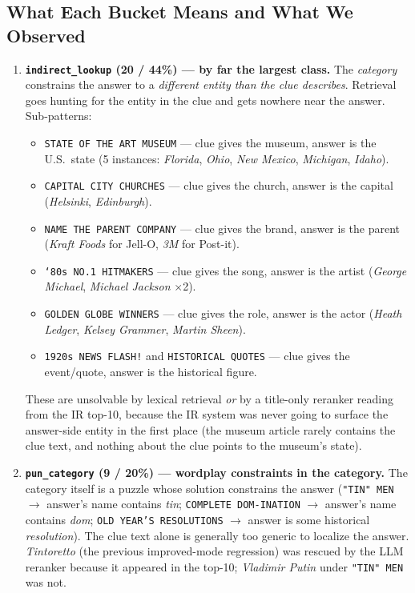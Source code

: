 \documentclass[11pt]{article}
\begin{document}
\subsection{What Each Bucket Means and What We Observed}

\begin{enumerate}
  \item \textbf{\texttt{indirect\_lookup} (20 / 44\%) --- by far the largest class.}
        The \emph{category} constrains the answer to a \emph{different
        entity than the clue describes}. Retrieval goes hunting for the
        entity in the clue and gets nowhere near the answer. Sub-patterns:
        \begin{itemize}
          \item \texttt{STATE OF THE ART MUSEUM} --- clue gives the museum,
                answer is the U.S.\ state (5 instances: \emph{Florida},
                \emph{Ohio}, \emph{New Mexico}, \emph{Michigan}, \emph{Idaho}).
          \item \texttt{CAPITAL CITY CHURCHES} --- clue gives the church,
                answer is the capital (\emph{Helsinki}, \emph{Edinburgh}).
          \item \texttt{NAME THE PARENT COMPANY} --- clue gives the brand,
                answer is the parent (\emph{Kraft Foods} for Jell-O,
                \emph{3M} for Post-it).
          \item \texttt{`80s NO.1 HITMAKERS} --- clue gives the song,
                answer is the artist (\emph{George Michael},
                \emph{Michael Jackson} $\times$2).
          \item \texttt{GOLDEN GLOBE WINNERS} --- clue gives the role,
                answer is the actor (\emph{Heath Ledger},
                \emph{Kelsey Grammer}, \emph{Martin Sheen}).
          \item \texttt{1920s NEWS FLASH!} and \texttt{HISTORICAL QUOTES}
                --- clue gives the event/quote, answer is the historical figure.
        \end{itemize}
        These are unsolvable by lexical retrieval \emph{or} by a
        title-only reranker reading from the IR top-10, because the IR
        system was never going to surface the answer-side entity in the
        first place (the museum article rarely contains the clue text,
        and nothing about the clue points to the museum's state).

  \item \textbf{\texttt{pun\_category} (9 / 20\%) --- wordplay constraints in
        the category.} The category itself is a puzzle whose solution
        constrains the answer (\texttt{"TIN" MEN} $\to$ answer's name
        contains \emph{tin}; \texttt{COMPLETE DOM-INATION} $\to$ answer's
        name contains \emph{dom}; \texttt{OLD YEAR'S RESOLUTIONS} $\to$
        answer is some historical \emph{resolution}). The clue text alone is
        generally too generic to localize the answer. \emph{Tintoretto}
        (the previous improved-mode regression) was rescued by the LLM
        reranker because it appeared in the top-10; \emph{Vladimir Putin}
        under \texttt{"TIN" MEN} was not.


\end{enumerate}
\end{document}
